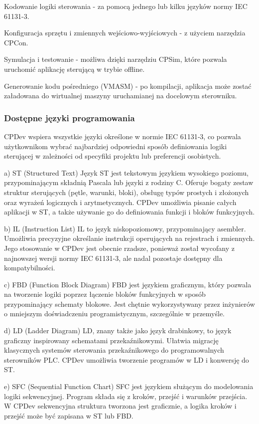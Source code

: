 \documentclass[12pt,twoside]{article}
\begin{document}
Kodowanie logiki sterowania - za pomocą jednego lub kilku języków normy IEC 61131-3.

Konfiguracja sprzętu i zmiennych wejściowo-wyjściowych - z użyciem narzędzia CPCon.

Symulacja i testowanie - możliwa dzięki narzędziu CPSim, które pozwala uruchomić aplikację sterującą w trybie offline.

Generowanie kodu pośredniego (VMASM) - po kompilacji, aplikacja może zostać załadowana do wirtualnej maszyny uruchamianej na docelowym sterowniku.

\subsubsection{Dostępne języki programowania}
CPDev wspiera wszystkie języki określone w normie IEC 61131‑3, co pozwala użytkownikom wybrać najbardziej odpowiedni sposób definiowania logiki sterującej w zależności od specyfiki projektu lub preferencji osobistych.

a) ST (Structured Text)
Język ST jest tekstowym językiem wysokiego poziomu, przypominającym składnią Pascala lub języki z rodziny C. Oferuje bogaty zestaw struktur sterujących (pętle, warunki, bloki), obsługę typów prostych i złożonych oraz wyrażeń logicznych i arytmetycznych. CPDev umożliwia pisanie całych aplikacji w ST, a także używanie go do definiowania funkcji i bloków funkcyjnych.

b) IL (Instruction List)
IL to język niskopoziomowy, przypominający asembler. Umożliwia precyzyjne określanie instrukcji operujących na rejestrach i zmiennych. Jego stosowanie w CPDev jest obecnie rzadsze, ponieważ został wycofany z najnowszej wersji normy IEC 61131-3, ale nadal pozostaje dostępny dla kompatybilności.

c) FBD (Function Block Diagram)
FBD jest językiem graficznym, który pozwala na tworzenie logiki poprzez łączenie bloków funkcyjnych w sposób przypominający schematy blokowe. Jest chętnie wykorzystywany przez inżynierów o mniejszym doświadczeniu programistycznym, szczególnie w przemyśle.

d) LD (Ladder Diagram)
LD, znany także jako język drabinkowy, to język graficzny inspirowany schematami przekaźnikowymi. Ułatwia migrację klasycznych systemów sterowania przekaźnikowego do programowalnych sterowników PLC. CPDev umożliwia tworzenie programów w LD i konwersję do ST.

e) SFC (Sequential Function Chart)
SFC jest językiem służącym do modelowania logiki sekwencyjnej. Program składa się z kroków, przejść i warunków przejścia. W CPDev sekwencyjna struktura tworzona jest graficznie, a logika kroków i przejść może być zapisana w ST lub FBD.
\end{document}

